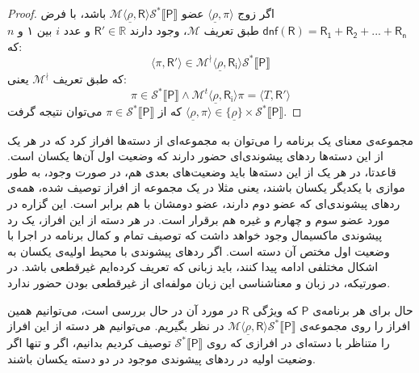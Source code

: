 \begin{proof}
	اگر زوج
	$\langle \underline{\rho}, \pi \rangle$ 
	عضو 
	$\mathcal{M}\langle \underline{\rho},\mathsf{R} \rangle \mathcal{S}^* \llbracket \mathsf{P} \rrbracket $
	باشد، با فرض 
	$\mathsf{dnf(R)=R_1+R_2+...+R_n}$
	طبق تعریف 
	$\mathcal{M}$،
	 وجود دارند $\mathsf{R'} \in \mathbb{R}$ و عدد $i$ بین ۱ و $n$ که: 
	$$\langle \pi , \mathsf{R'} \rangle \in \mathcal{M}^\nmid \langle \underline{\rho},\mathsf{R_i} \rangle \mathcal{S}^* \llbracket \mathsf{P} \rrbracket$$
	که طبق تعریف $\mathcal{M^\nmid}$ یعنی: 
	$$\pi \in \mathcal{S}^* \llbracket \mathsf{P} \rrbracket \land \mathcal{M}^t \langle \underline{\rho},\mathsf{R_i}\rangle \pi = \langle \mathit{T},\mathsf{R'} \rangle$$
که از 
$\pi \in \mathcal{S}^* \llbracket \mathsf{P} \rrbracket$
می‌توان نتیجه گرفت 
$\langle \underline{\rho}, \pi \rangle \in \{\underline{\rho}\} \times \mathcal{S}^* \llbracket \mathsf{P} \rrbracket$.

\end{proof}


مجموعه‌ی معنای یک برنامه را می‌توان به مجموعه‌ای از دسته‌ها افراز کرد که در هر یک از این دسته‌ها ردهای پیشوندی‌ای حضور دارند که وضعیت اول آن‌ها یکسان است. قاعدتا، در هر یک از این دسته‌ها باید وضعیت‌های بعدی هم، در صورت وجود، به طور موازی با یکدیگر یکسان باشند، یعنی مثلا در یک مجموعه از افراز توصیف شده، همه‌ی ردهای پیشوندی‌ای که عضو دوم دارند، عضو دومشان با هم برابر است. این گزاره در مورد عضو سوم و چهارم و غیره هم برقرار است. در هر دسته از این افراز، یک رد پیشوندی ماکسیمال وجود خواهد داشت که توصیف تمام و کمال برنامه در اجرا با وضعیت اول مختص آن دسته است.
اگر ردهای پیشوندی با محیط اولیه‌ی یکسان به اشکال مختلفی ادامه پیدا کنند، باید زبانی که تعریف کرده‌ایم غیرقطعی باشد. در صورتیکه، در زبان و معناشناسی این زبان مولفه‌ای از غیرقطعی بودن حضور ندارد.

حال برای هر برنامه‌ی $\mathsf{P}$ که ویژگی $\mathsf{R}$ در مورد آن در حال بررسی است، می‌توانیم همین افراز را روی مجموعه‌ی 
$\mathcal{M} \langle \underline{\rho}, \mathsf{R} \rangle \mathcal{S}^* \llbracket \mathsf{P} \rrbracket$
در نظر بگیریم. می‌توانیم هر دسته از این افراز را متناظر با دسته‌ای در افرازی که روی 
$\mathcal{S}^* \llbracket \mathsf{P}\rrbracket$ 
توصیف کردیم بدانیم، اگر و تنها اگر وضعیت اولیه در ردهای پیشوندی موجود در دو دسته یکسان باشند.

